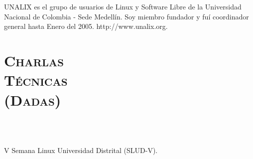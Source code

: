 \begin{resume}
\begin{formatb}
  \\
   
  \body\\
\end{formatb}

\begin{position}
UNALIX es el grupo de usuarios de Linux y Software Libre de la
Universidad Nacional de Colombia - Sede Medell\'{i}n. Soy miembro
fundador y fu\'{i} coordinador general hasta Enero del 2005. http://www.unalix.org.
\end{position}


\section{\textsc{Charlas \\ T\'{e}cnicas \\ (Dadas)}}

\begin{formatb}
  \\
  \\
   \body
\end{formatb}

\begin{position}
V Semana Linux Universidad Distrital (SLUD-V).
\end{position}



\end{resume}
